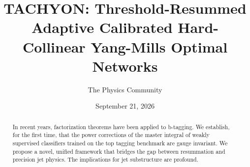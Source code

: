 \documentclass[11pt]{article}
\title{TACHYON: Threshold-Resummed Adaptive Calibrated Hard-Collinear Yang-Mills Optimal Networks}
\author{The Physics Community}
\date{September 21, 2026}
\begin{document}
\maketitle
\begin{abstract}
In recent years, factorization theorems have been applied to b-tagging.
We establish, for the first time, that the power corrections of the
master integral of weakly supervised classifiers trained on the top
tagging benchmark are gauge invariant. We propose a novel, unified
framework that bridges the gap between resummation and precision jet
physics. The implications for jet substructure are profound.
\end{abstract}
\tableofcontents




\nocite{*}


\end{document}
